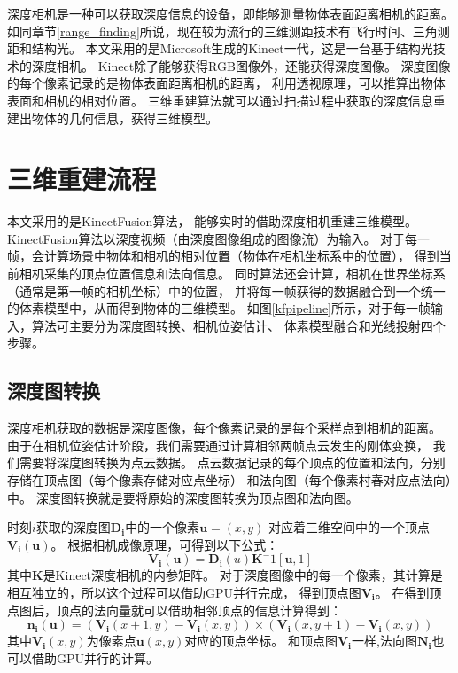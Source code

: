 深度相机是一种可以获取深度信息的设备，即能够测量物体表面距离相机的距离。
如同章节\ref{range_finding}所说，现在较为流行的三维测距技术有飞行时间、三角测距和结构光。
本文采用的是Microsoft生成的Kinect一代，这是一台基于结构光技术的深度相机。
Kinect除了能够获得RGB图像外，还能获得深度图像。
深度图像的每个像素记录的是物体表面距离相机的距离，
利用透视原理，可以推算出物体表面和相机的相对位置。
三维重建算法就可以通过扫描过程中获取的深度信息重建出物体的几何信息，获得三维模型。

\section{三维重建流程}
本文采用的是KinectFusion算法\cite{izadi2011kinectfusion}，
能够实时的借助深度相机重建三维模型。
KinectFusion算法\cite{izadi2011kinectfusion}以深度视频（由深度图像组成的图像流）为输入。
对于每一帧，会计算场景中物体和相机的相对位置（物体在相机坐标系中的位置），
得到当前相机采集的顶点位置信息和法向信息。
同时算法还会计算，相机在世界坐标系（通常是第一帧的相机坐标）中的位置，
并将每一帧获得的数据融合到一个统一的体素模型中，从而得到物体的三维模型。
如图\ref{kfpipeline}所示，对于每一帧输入，算法可主要分为深度图转换、相机位姿估计、
体素模型融合和光线投射四个步骤。

\subsection{深度图转换}
深度相机获取的数据是深度图像，每个像素记录的是每个采样点到相机的距离。
由于在相机位姿估计阶段，我们需要通过计算相邻两帧点云发生的刚体变换，
我们需要将深度图转换为点云数据。
点云数据记录的每个顶点的位置和法向，分别存储在顶点图（每个像素存储对应点坐标）
和法向图（每个像素村春对应点法向）中。
深度图转换就是要将原始的深度图转换为顶点图和法向图。

时刻$i$获取的深度图$\bm{D_i}$中的一个像素$\bm{u}=(x,y)$
对应着三维空间中的一个顶点$\bm{V_i}(\bm{u})$。
根据相机成像原理，可得到以下公式：
\begin{equation}
    \bm{V_i(u)}=\bm{D_i}(u)\bm{K}^-1[\bm{u},1]
\end{equation}
其中$\bm{K}$是Kinect深度相机的内参矩阵。
对于深度图像中的每一个像素，其计算是相互独立的，所以这个过程可以借助GPU并行完成，
得到顶点图$\bm{V_i}$。
在得到顶点图后，顶点的法向量就可以借助相邻顶点的信息计算得到：
\begin{equation}
    \bm{n_i}(\bm{u})=(\bm{V_i}(x+1,y)-\bm{V_i}(x,y))\times(\bm{V_i}(x,y+1)-\bm{V_i}(x,y))
\end{equation}
其中$\bm{V_i}(x,y)$为像素点$\bm{u}(x,y)$对应的顶点坐标。
和顶点图$\bm{V_i}$一样,法向图$\bm{N_i}$也可以借助GPU并行的计算。

